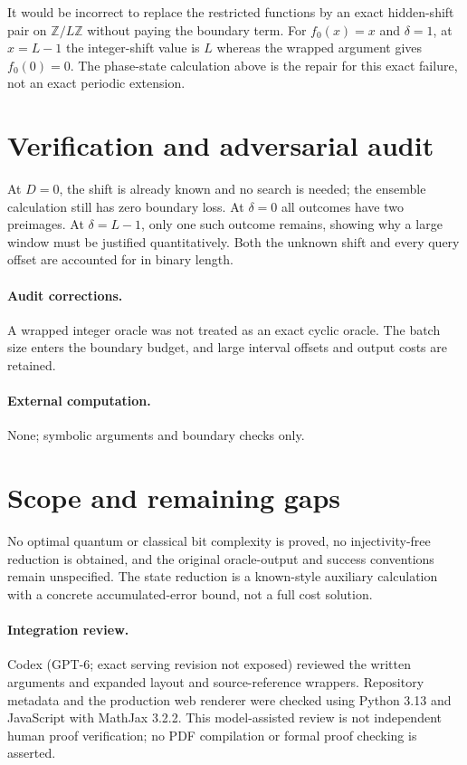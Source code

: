 \documentclass[11pt]{article}
\begin{document}
It would be incorrect to replace the restricted functions by an exact hidden-shift pair on $\mathbb Z/L\mathbb Z$ without paying the boundary term. For $f_0(x)=x$ and $\delta=1$, at $x=L-1$ the integer-shift value is $L$ whereas the wrapped argument gives $f_0(0)=0$. The phase-state calculation above is the repair for this exact failure, not an exact periodic extension.
\section{Verification and adversarial audit}
At $D=0$, the shift is already known and no search is needed; the ensemble calculation still has zero boundary loss. At $\delta=0$ all outcomes have two preimages. At $\delta=L-1$, only one such outcome remains, showing why a large window must be justified quantitatively. Both the unknown shift and every query offset are accounted for in binary length.
\paragraph{Audit corrections.} A wrapped integer oracle was not treated as an exact cyclic oracle. The batch size enters the boundary budget, and large interval offsets and output costs are retained.
\paragraph{External computation.} None; symbolic arguments and boundary checks only.
\section{Scope and remaining gaps}
No optimal quantum or classical bit complexity is proved, no injectivity-free reduction is obtained, and the original oracle-output and success conventions remain unspecified. The state reduction is a known-style auxiliary calculation with a concrete accumulated-error bound, not a full cost solution.
\paragraph{Integration review.} Codex (GPT-6; exact serving revision not exposed) reviewed the written arguments and expanded layout and source-reference wrappers. Repository metadata and the production web renderer were checked using Python 3.13 and JavaScript with MathJax 3.2.2. This model-assisted review is not independent human proof verification; no PDF compilation or formal proof checking is asserted.
\end{document}
